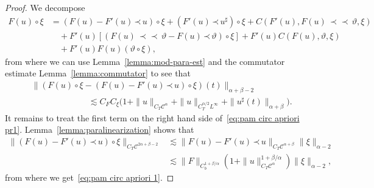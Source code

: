 \documentclass[a4paper,11pt]{article}
\theoremstyle{remark}
\newcommand{\CC}{\ensuremath{\mathscr{C}}}
\newcommand{\lpara}{\,\mathord{\prec}\,}
\newcommand{\reso}{\,\mathord{\circ}\,}
\newcommand{\mpara}{\,\mathord{\prec\!\!\!\prec}\,}
\begin{document}
\begin{proof}
   We decompose
   \begin{align}\label{eq:pam circ apriori pr1} \nonumber
      F(u) \reso \xi & = (F(u) - F'(u) \lpara u) \reso \xi + (F'(u) \lpara u^\sharp) \reso \xi + C(F'(u),F(u)\mpara \vartheta, \xi) \\ \nonumber
      &\quad + F'(u) [(F(u) \mpara \vartheta - F(u) \lpara \vartheta)\reso \xi] + F'(u) C(F(u),\vartheta,\xi) \\
      &\quad + F'(u)F(u) (\vartheta \reso \xi),
   \end{align}
   from where we can use Lemma~\ref{lemma:mod-para-est} and the commutator estimate Lemma~\ref{lemma:commutator} to see that
   \begin{align*}
      &\| (F(u) \reso \xi - (F(u) - F'(u) \lpara u) \reso \xi)(t) \|_{\alpha+\beta-2} \\
      &\hspace{80pt} \lesssim C_F C_\xi \big(1 + \|u\|_{C_T\CC^\alpha} + \|u\|_{C^{\alpha/2}_T L^\infty} + \|u^\sharp(t) \|_{\alpha+\beta}\big).
   \end{align*}
   It remains to treat the first term on the right hand side of~\eqref{eq:pam circ apriori pr1}. Lemma~\ref{lemma:paralinearization} shows that
   \begin{align*}
      \| (F(u) - F'(u) \lpara u) \reso \xi \|_{C_T\CC^{2\alpha+\beta-2}} & \lesssim \| F(u) - F'(u) \lpara u \|_{C_T\CC^{\alpha+\beta}} \| \xi\|_{\alpha-2} \\
      & \lesssim \|F\|_{C^{1+\beta/\alpha}_b} ( 1 + \| u \|_{C_T \CC^\alpha}^{1+\beta/\alpha}) \|\xi\|_{\alpha-2},
   \end{align*}
   from where we get~\eqref{eq:pam circ apriori 1}.
   

\end{proof}
\end{document}
